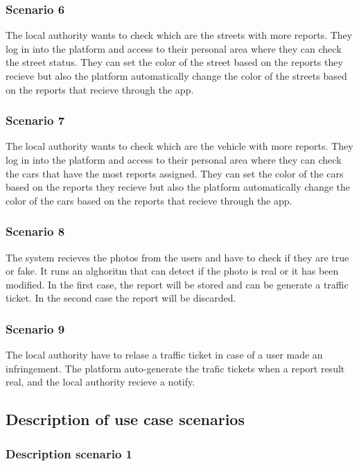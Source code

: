 \subsubsection{Scenario 6}
The local authority wants to check which are the streets with more reports. They log in into the platform and access to their personal area where they can check the street status. They can set the color of the street based on the reports they recieve but also the platform automatically change the color of the streets based on the reports that recieve through the app.

 
\subsubsection{Scenario 7}
The local authority wants to check which are the vehicle with more reports. They log in into the platform and access to their personal area where they can check the cars that have the most reports assigned. They can set the color of the cars based on the reports they recieve but also the platform automatically change the color of the cars based on the reports that recieve through the app.

\subsubsection{Scenario 8}
The system recieves the photos from the users and have to check if they are true or fake. It runs an alghoritm that can detect if the photo is real or it has been modified. In the first case, the report will be stored and can be generate a traffic ticket. In the second case the report will be discarded.

\subsubsection{Scenario 9}
The local authority have to relase a traffic ticket in case of a user made an infringement. The platform auto-generate the trafic tickets when a report result real, and the local authority recieve a notify.

\subsection{Description of use case scenarios}
\subsubsection{Description scenario 1}


